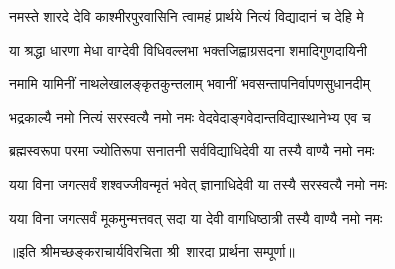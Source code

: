 

\twolineshloka
{नमस्ते शारदे देवि काश्मीरपुरवासिनि}
{त्वामहं प्रार्थये नित्यं विद्यादानं च देहि मे}

\twolineshloka
{या श्रद्धा धारणा मेधा वाग्देवी विधिवल्लभा}
{भक्तजिह्वाग्रसदना शमादिगुणदायिनी}

\twolineshloka
{नमामि यामिनीं नाथलेखालङ्कृतकुन्तलाम्}
{भवानीं भवसन्तापनिर्वापणसुधानदीम्}

\twolineshloka
{भद्रकाल्यै नमो नित्यं सरस्वत्यै नमो नमः}
{वेदवेदाङ्गवेदान्तविद्यास्थानेभ्य एव च}

\twolineshloka
{ब्रह्मस्वरूपा परमा ज्योतिरूपा सनातनी}
{सर्वविद्याधिदेवी या तस्यै वाण्यै नमो नमः}

\twolineshloka
{यया विना जगत्सर्वं शश्वज्जीवन्मृतं भवेत्}
{ज्ञानाधिदेवी या तस्यै सरस्वत्यै नमो नमः}

\twolineshloka
{यया विना जगत्सर्वं मूकमुन्मत्तवत् सदा}
{या देवी वागधिष्ठात्री तस्यै वाण्यै नमो नमः}

॥इति श्रीमच्छङ्कराचार्यविरचिता श्री~शारदा प्रार्थना सम्पूर्णा॥
